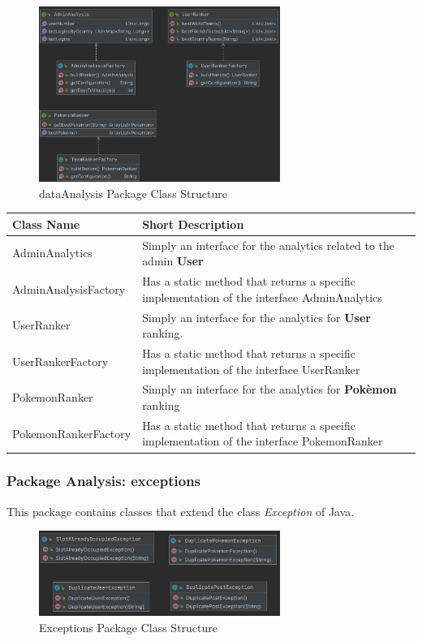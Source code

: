 \begin{figure}[H]
	\centering
	\includegraphics[width=0.7\textwidth]{img/dataAnalysis_package.png}
	\caption{dataAnalysis Package Class Structure}
\end{figure}

\begingroup
\setlength{\tabcolsep}{10pt} %
\renewcommand{\arraystretch}{1.5} %
\begin{center}
	\begin{longtable}{| m{14em} | m{19em} |} 
		\hline
		\textbf{Class Name} & \textbf{Short Description} \\ [0.5ex] 
		\hline
		AdminAnalytics &Simply an interface for the analytics related to the admin \textbf{User}\\ 
		\hline
		AdminAnalysisFactory & Has a static method that returns a specific implementation of the interface AdminAnalytics\\ 
		\hline
		UserRanker & Simply an interface for the analytics for \textbf{User} ranking.\\ 
		\hline
		UserRankerFactory & Has a static method that returns a specific implementation of the interface UserRanker\\ 
		\hline
		PokemonRanker & Simply an interface for the analytics for \textbf{Pokèmon} ranking\\ 
		\hline
		PokemonRankerFactory & Has a static method that returns a specific implementation of the interface PokemonRanker\\
		\hline
	\end{longtable}
\end{center}
\endgroup

\subsubsection{Package Analysis: exceptions}
This package contains classes that extend the class \textit{Exception} of Java. 
\begin{figure}[H]
	\centering
	\includegraphics[width=0.7\textwidth]{img/exceptions_package.png}
	\caption{Exceptions Package Class Structure}
\end{figure}

